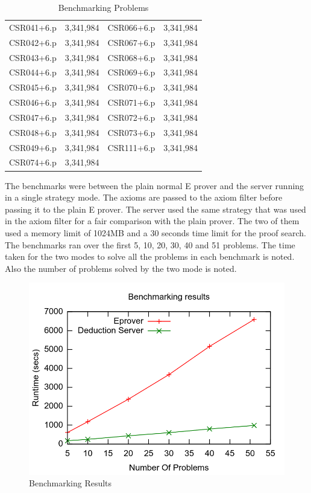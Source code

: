 \begin{table}[ht]
\begin{center}
\begin{tabular}{c|c||c|c}
      CSR041+6.p   & 3,341,984          & CSR066+6.p   & 3,341,984 \\
      CSR042+6.p   & 3,341,984          & CSR067+6.p   & 3,341,984 \\
      CSR043+6.p   & 3,341,984          & CSR068+6.p   & 3,341,984 \\
      CSR044+6.p   & 3,341,984          & CSR069+6.p   & 3,341,984 \\
      CSR045+6.p   & 3,341,984          & CSR070+6.p   & 3,341,984 \\
      CSR046+6.p   & 3,341,984          & CSR071+6.p   & 3,341,984 \\
      CSR047+6.p   & 3,341,984          & CSR072+6.p   & 3,341,984 \\
      CSR048+6.p   & 3,341,984          & CSR073+6.p   & 3,341,984 \\
      CSR049+6.p   & 3,341,984          & CSR111+6.p   & 3,341,984 \\
      CSR074+6.p   & 3,341,984          &              &           \\
      \bottomrule
    \end{tabular}
  \end{center}
\caption{Benchmarking Problems}
\label{Table:BenchmarkingProblems}
\end{table}

The benchmarks were between the plain normal E prover and the server running in a single strategy mode. The axioms are passed to the axiom filter before passing it to the plain E prover. The server used the same strategy that was used in the axiom filter for a fair comparison with the plain prover. The two of them used a memory limit of 1024MB and a 30 seconds time limit for the proof search. The benchmarks ran over the first 5, 10, 20, 30, 40 and 51 problems. The time taken for the two modes to solve all the problems in each benchmark is noted. Also the number of problems solved by the two mode is noted.

\begin{figure}[ht!]
  \centering
  \includegraphics[width=150mm]{graphics/BenchmarkingResults.png}
  \caption{Benchmarking Results\label{benchmarking_results}}
\end{figure}

